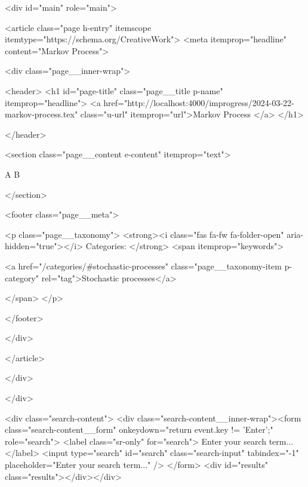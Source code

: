 <div id="main" role="main">
  


  <article class="page h-entry" itemscope itemtype="https://schema.org/CreativeWork">
    <meta itemprop="headline" content="Markov Process">
    
    
    

    <div class="page__inner-wrap">
      
        <header>
          <h1 id="page-title" class="page__title p-name" itemprop="headline">
            <a href="http://localhost:4000/improgress/2024-03-22-markov-process.tex" class="u-url" itemprop="url">Markov Process
</a>
          </h1>
          


        </header>
      

      <section class="page__content e-content" itemprop="text">
        
        A \cup B
        
      </section>

      <footer class="page__meta">
        
        


  


  

  <p class="page__taxonomy">
    <strong><i class="fas fa-fw fa-folder-open" aria-hidden="true"></i> Categories: </strong>
    <span itemprop="keywords">
    
      <a href="/categories/#stochastic-processes" class="page__taxonomy-item p-category" rel="tag">Stochastic processes</a>
    
    </span>
  </p>


        

      </footer>

      

      
    </div>

    
  </article>

  
  
</div>

    </div>

    
      <div class="search-content">
        <div class="search-content__inner-wrap"><form class="search-content__form" onkeydown="return event.key != 'Enter';" role="search">
    <label class="sr-only" for="search">
      Enter your search term...
    </label>
    <input type="search" id="search" class="search-input" tabindex="-1" placeholder="Enter your search term..." />
  </form>
  <div id="results" class="results"></div></div>

